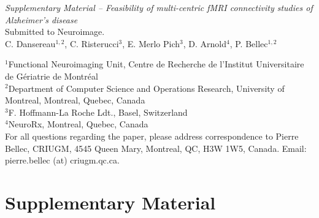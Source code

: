 \documentclass[authoryear]{elsarticle}
\begin{document}
\clearpage
\pagebreak
\renewcommand{\thefigure}{S\arabic{figure}}
\renewcommand{\thetable}{S\arabic{table}}
\setcounter{figure}{0}
\begin{center}
\emph{Supplementary Material {--} Feasibility of multi-centric fMRI connectivity studies of Alzheimer's disease}\\

\vspace{\baselineskip}Submitted to Neuroimage.\\

\vspace{\baselineskip}C. Dansereau$^{1,2}$,  C. Risterucci$^{3}$, E. Merlo Pich$^{3}$, D. Arnold$^{4}$, P. Bellec$^{1,2}$\\

\end{center}
$^1$Functional Neuroimaging Unit, Centre de Recherche de l'Institut Universitaire de G\'eriatrie de Montr\'eal\\
$^2$Department of Computer Science and Operations Research, University of Montreal, Montreal, Quebec, Canada\\
$^3$F. Hoffmann-La Roche Ldt., Basel, Switzerland\\
$^4$NeuroRx, Montreal, Quebec, Canada\\

For all questions regarding the paper, please address correspondence to Pierre Bellec, CRIUGM, 4545 Queen Mary, Montreal, QC, H3W 1W5, Canada. Email: pierre.bellec (at) criugm.qc.ca.\\

\section*{Supplementary Material} 
\end{document}
